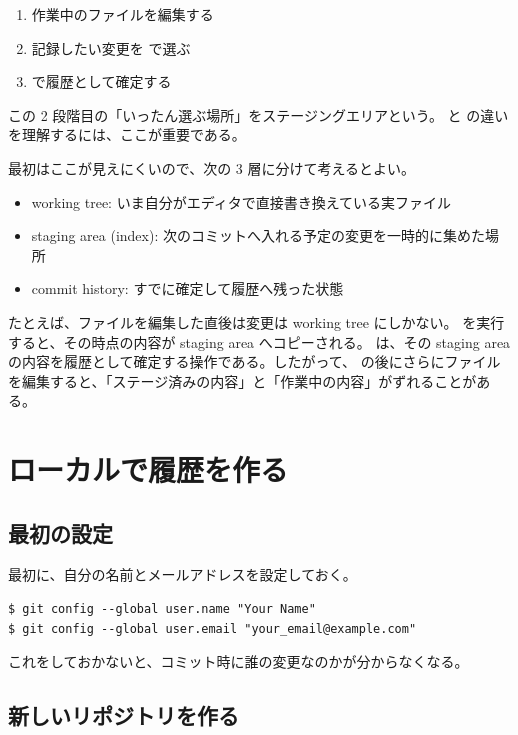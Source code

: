 \begin{enumerate}
\item 作業中のファイルを編集する
\item 記録したい変更を  で選ぶ
\item {} で履歴として確定する
\end{enumerate}

この 2 段階目の「いったん選ぶ場所」をステージングエリアという。 と  の違いを理解するには、ここが重要である。

最初はここが見えにくいので、次の 3 層に分けて考えるとよい。

\begin{itemize}
\item working tree: いま自分がエディタで直接書き換えている実ファイル
\item staging area (index): 次のコミットへ入れる予定の変更を一時的に集めた場所
\item commit history: すでに確定して履歴へ残った状態
\end{itemize}

たとえば、ファイルを編集した直後は変更は working tree にしかない。 を実行すると、その時点の内容が staging area へコピーされる。 は、その staging area の内容を履歴として確定する操作である。したがって、 の後にさらにファイルを編集すると、「ステージ済みの内容」と「作業中の内容」がずれることがある。

\section{ローカルで履歴を作る}

\subsection{最初の設定}

最初に、自分の名前とメールアドレスを設定しておく。

\begin{lstlisting}[numbers=none, xleftmargin=2\zw]
$ git config --global user.name "Your Name"
$ git config --global user.email "your_email@example.com"
\end{lstlisting}

これをしておかないと、コミット時に誰の変更なのかが分からなくなる。

\subsection{新しいリポジトリを作る}


